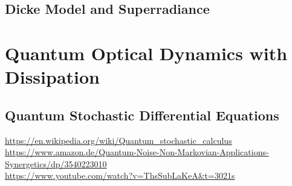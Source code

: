 \documentclass[9pt]{report}
\begin{document}
\subsection{Dicke Model and Superradiance}





\section{Quantum Optical Dynamics with Dissipation}

\subsection{Quantum Stochastic Differential Equations}
\url{https://en.wikipedia.org/wiki/Quantum_stochastic_calculus}\\
\url{https://www.amazon.de/Quantum-Noise-Non-Markovian-Applications-Synergetics/dp/3540223010}\\
\url{https://www.youtube.com/watch?v=ThsSubLaKeA&t=3021s}\\
\end{document}
